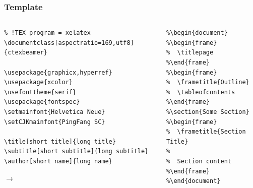 \documentclass[aspectratio=169,utf8]{beamer}
\begin{document}
\begin{frame}[fragile]
  \frametitle{Template}

  \begin{columns}[t]
    \begin{column}{.5\textwidth}
      \scriptsize
\begin{verbatim}
% !TEX program = xelatex
\documentclass[aspectratio=169,utf8]{ctexbeamer}

\usepackage{graphicx,hyperref}
\usepackage{xcolor}
\usefonttheme{serif}
\usepackage{fontspec}
\setmainfont{Helvetica Neue}
\setCJKmainfont{PingFang SC}

\title[short title]{long title}
\subtitle[short subtitle]{long subtitle}
\author[short name]{long name}
\end{verbatim}

      $\longrightarrow$
      
    \end{column}

    \begin{column}{.35\textwidth}
      \scriptsize
\begin{verbatim}
%\begin{document}
%\begin{frame}
%  \titlepage
%\end{frame}
%\begin{frame}
%  \frametitle{Outline}
%  \tableofcontents
%\end{frame}
%\section{Some Section}
%\begin{frame}
%  \frametitle{Section Title}
%
%  Section content
%\end{frame}
%\end{document}
\end{verbatim}
      
    \end{column}
    
  \end{columns}

\end{frame}
\end{document}
